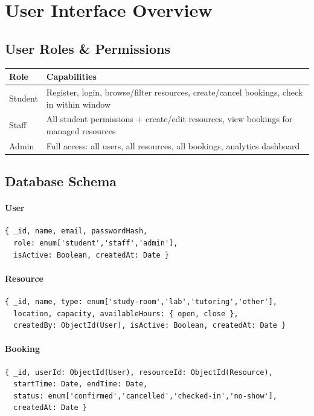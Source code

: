 \documentclass[12pt]{article}
\begin{document}
\section{User Interface Overview}

\subsection{User Roles \& Permissions}

\begin{longtable}{|p{2.2cm}|p{11cm}|}
\hline
\textbf{Role} & \textbf{Capabilities} \\
\hline
Student & Register, login, browse/filter resources, create/cancel bookings, check in within window \\
\hline
Staff   & All student permissions + create/edit resources, view bookings for managed resources \\
\hline
Admin   & Full access: all users, all resources, all bookings, analytics dashboard \\
\hline
\end{longtable}

\subsection{Database Schema}

\paragraph{User}
\begin{verbatim}
{ _id, name, email, passwordHash,
  role: enum['student','staff','admin'],
  isActive: Boolean, createdAt: Date }
\end{verbatim}

\paragraph{Resource}
\begin{verbatim}
{ _id, name, type: enum['study-room','lab','tutoring','other'],
  location, capacity, availableHours: { open, close },
  createdBy: ObjectId(User), isActive: Boolean, createdAt: Date }
\end{verbatim}

\paragraph{Booking}
\begin{verbatim}
{ _id, userId: ObjectId(User), resourceId: ObjectId(Resource),
  startTime: Date, endTime: Date,
  status: enum['confirmed','cancelled','checked-in','no-show'],
  createdAt: Date }
\end{verbatim}
\end{document}
